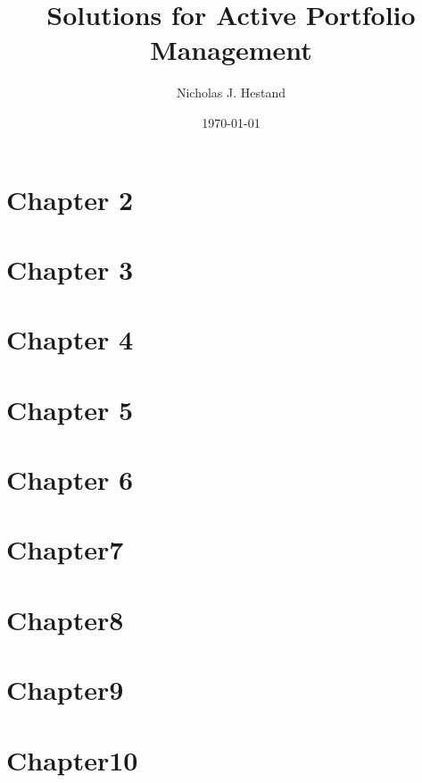 \documentclass[10pt]{article}
\begin{document}
  \title{Solutions for Active Portfolio Management}
  \author{Nicholas J. Hestand}
  \date{\today}
  
  \maketitle
  
  \section*{Chapter 2}
  
  
  \newpage
  \section*{Chapter 3}
  
  
  \newpage
  \section*{Chapter 4}
  
  
  \newpage
  \section*{Chapter 5}
  
  
  \newpage
  \section*{Chapter 6}
  
  
  \newpage
  \section*{Chapter7}
  
  
  \newpage
  \section*{Chapter8}
  
  
  \newpage
  \section*{Chapter9}
  
  
  \newpage
  \section*{Chapter10}
  
  
\end{document}
